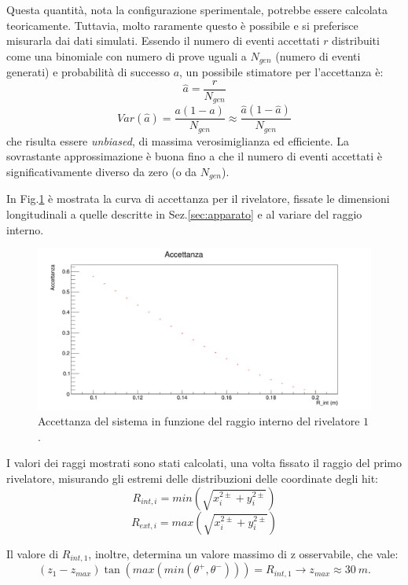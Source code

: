 \documentclass[8pt]{extarticle}
\begin{document}
Questa quantità, nota la configurazione sperimentale, potrebbe essere calcolata teoricamente. Tuttavia, molto raramente questo è possibile e si preferisce misurarla dai dati simulati. Essendo il numero di eventi accettati $r$ distribuiti come una binomiale con numero di prove uguali a $N_{gen}$ (numero di eventi generati) e probabilità di successo $a$, un possibile stimatore per l'accettanza è: 
$$
\hat{a} = \frac{r}{N_{gen}}
$$
$$
Var(\hat{a}) = \frac{a(1-a)}{N_{gen}} \approx \frac{\hat{a}(1-\hat{a})}{N_{gen}}
$$
che risulta essere \textit{unbiased}, di massima verosimiglianza ed efficiente. La sovrastante approssimazione è buona fino a che il numero di eventi accettati è significativamente diverso da zero (o da $N_{gen}$). 

In Fig.\ref{fig:acc_vs_rint} è mostrata la curva di accettanza per il rivelatore, fissate le dimensioni longitudinali a quelle descritte in Sez.\ref{sec:apparato} e al variare del raggio interno.

\begin{figure}
	\begin{center}
		\includegraphics[scale=0.3]{acc_vs_rint} 
		\caption{Accettanza del sistema in funzione del raggio interno del rivelatore $1$.}
		\label{fig:acc_vs_rint}
	\end{center}
\end{figure}

I valori dei raggi mostrati sono stati calcolati, una volta fissato il raggio del primo rivelatore, misurando gli estremi delle distribuzioni delle coordinate degli hit: 
$$
R_{int, i} = min(\sqrt{x_i^{2 \pm} + y_i^{2 \pm}})
$$
$$
R_{ext, i} = max(\sqrt{x_i^{2 \pm} + y_i^{2 \pm}})
$$

Il valore di $R_{int, 1}$, inoltre, determina un valore massimo di z osservabile, che vale: \\
$$
(z_1 - z_{max})\tan{(max(min(\theta^+, \theta^-)))} = R_{int,1} \rightarrow z_{max} \approx 30\ m.
$$
\end{document}
